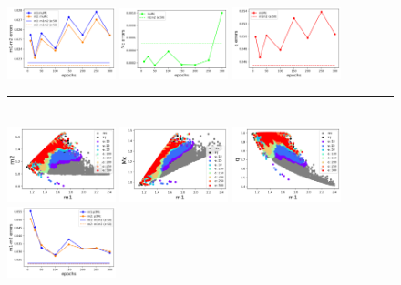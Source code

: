 \documentclass[prd,aps,twocolumn,a4paper,showkeys,nofootinbib]{revtex4-1}
\begin{document}
\begin{figure}[]
  \includegraphics[width=0.28\textwidth]{./Figs/muMc_err_m1m2.png}
  \includegraphics[width=0.28\textwidth]{./Figs/muMc_err_Mc.png}
  \includegraphics[width=0.28\textwidth]{./Figs/muMc_err_q.png} \\
  \rule[1ex]{14cm}{0.5pt}\\
  \includegraphics[width=0.28\textwidth]{./Figs/p3Mc_rainbow_m1m2.png}
  \includegraphics[width=0.28\textwidth]{./Figs/p3Mc_rainbow_m1Mc.png}
  \includegraphics[width=0.28\textwidth]{./Figs/p3Mc_rainbow_m1q.png} \\
  \includegraphics[width=0.28\textwidth]{./Figs/p3Mc_err_m1m2.png}

\end{figure}
\end{document}
